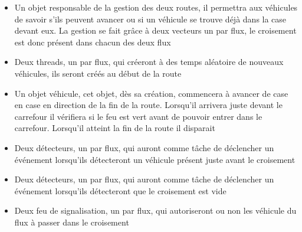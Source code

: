 \begin{itemize}
\item Un objet responsable de la gestion des deux routes, il permettra aux véhicules de savoir s'ils peuvent avancer ou si un véhicule se trouve déjà dans la case devant eux. La gestion se fait grâce à deux vecteurs un par flux, le croisement est donc présent dans chacun des deux flux
\item Deux threads, un par flux, qui créeront à des temps aléatoire de nouveaux véhicules, ils seront créés au début de la route
\item Un objet véhicule, cet objet, dès sa création, commencera à avancer de case en case en direction de la fin de la route. Lorsqu'il arrivera juste devant le carrefour il vérifiera si le feu est vert avant de pouvoir entrer dans le carrefour. Lorsqu'il atteint la fin de la route il disparait
\item Deux détecteurs, un par flux, qui auront comme tâche de déclencher un événement lorsqu'ils détecteront un véhicule présent juste avant le croisement
\item Deux détecteurs, un par flux, qui auront comme tâche de déclencher un événement lorsqu'ils détecteront que le croisement est vide
\item Deux feu de signalisation, un par flux, qui autoriseront ou non les véhicule du flux à passer dans le croisement
\end{itemize}